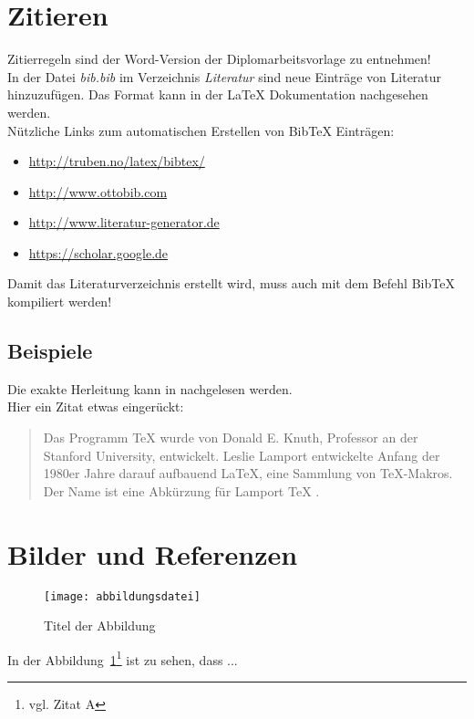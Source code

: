 \section{Zitieren}
Zitierregeln sind der Word-Version der Diplomarbeitsvorlage zu entnehmen! \\
In der Datei \textit{bib.bib} im Verzeichnis \textit{Literatur} sind neue Eintr\"age von Literatur hinzuzuf\"ugen. Das Format kann in der \LaTeX{} Dokumentation nachgesehen werden. \\
N\"utzliche Links zum automatischen Erstellen von BibTeX Eintr\"agen:
\begin{itemize}
	\item \url{http://truben.no/latex/bibtex/}
	\item \url{http://www.ottobib.com}
	\item \url{http://www.literatur-generator.de}
	\item \url{https://scholar.google.de}
\end{itemize}
Damit das Literaturverzeichnis erstellt wird, muss auch mit dem Befehl BibTeX kompiliert werden! \\
\subsection{Beispiele}
Die exakte Herleitung kann in \cite{Prager1961} nachgelesen werden. \\
Hier ein Zitat etwas einger\"uckt:
\begin{quote}
Das Programm TeX wurde von Donald E. Knuth, Professor an der Stanford University, entwickelt. Leslie Lamport entwickelte Anfang der 1980er Jahre darauf aufbauend LaTeX, eine Sammlung von TeX-Makros. Der Name ist eine Abk\"urzung für Lamport TeX \cite{latextug}.
\end{quote}

\section{Bilder und Referenzen}
\begin{figure}[htbp]
\centering
\texttt{[image: abbildungsdatei]} %
\caption{Titel der Abbildung} 
\label{fig:bild1}
\end{figure}

In der Abbildung~\ref{fig:bild1}\footnote{vgl. Zitat A\cite{referenzA}} %
ist zu sehen, dass ...

